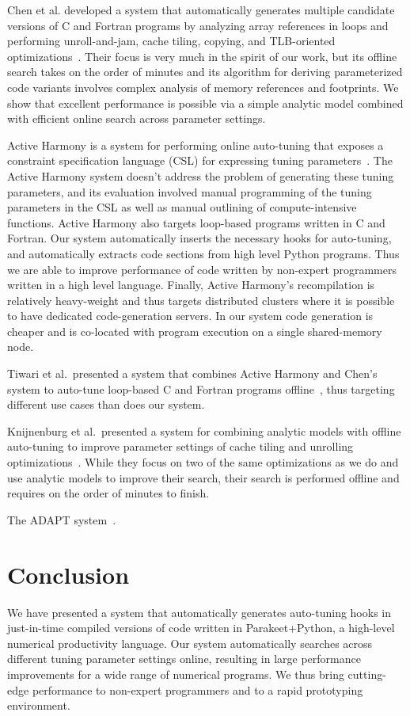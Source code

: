 \documentclass[preprint,9pt]{sigplanconf}
\begin{document}
Chen et al. developed a system that automatically generates multiple candidate versions of C and Fortran programs by analyzing array references in loops and performing unroll-and-jam, cache tiling, copying, and TLB-oriented optimizations~\cite{Chen05b}.  Their focus is very much in the spirit of our work, but its offline search takes on the order of minutes and its algorithm for deriving parameterized code variants involves complex analysis of memory references and footprints.  We show that excellent performance is possible via a simple analytic model combined with efficient online search across parameter settings.

Active Harmony is a system for performing online auto-tuning that exposes a constraint specification language (CSL) for expressing tuning parameters~\cite{Tiwa11}.  The Active Harmony system doesn't address the problem of generating these tuning parameters, and its evaluation involved manual programming of the tuning parameters in the CSL as well as manual outlining of compute-intensive functions.  Active Harmony also targets loop-based programs written in C and Fortran.  Our system automatically inserts the necessary hooks for auto-tuning, and automatically extracts code sections from high level Python programs.  Thus we are able to improve performance of code written by non-expert programmers written in a high level language.  Finally, Active Harmony's recompilation is relatively heavy-weight and thus targets distributed clusters where it is possible to have dedicated code-generation servers.  In our system code generation is cheaper and is co-located with program execution on a single shared-memory node.

Tiwari et al.~presented a system that combines Active Harmony and Chen's system to auto-tune loop-based C and Fortran programs offline~\cite{Tiwa09}, thus targeting different use cases than does our system.

Knijnenburg et al.~presented a system for combining analytic models with offline auto-tuning to improve parameter settings of cache tiling and unrolling optimizations~\cite{Knij04}.  While they focus on two of the same optimizations as we do and use analytic models to improve their search, their search is performed offline and requires on the order of minutes to finish.

The ADAPT system~\cite{Voss99}.

\section{Conclusion}
\label{conclusion}
We have presented a system that automatically generates auto-tuning hooks in just-in-time compiled versions of code written in Parakeet+Python, a high-level numerical productivity language.  Our system automatically searches across different tuning parameter settings online, resulting in large performance improvements for a wide range of numerical programs.  We thus bring cutting-edge performance to non-expert programmers and to a rapid prototyping environment.
\end{document}
